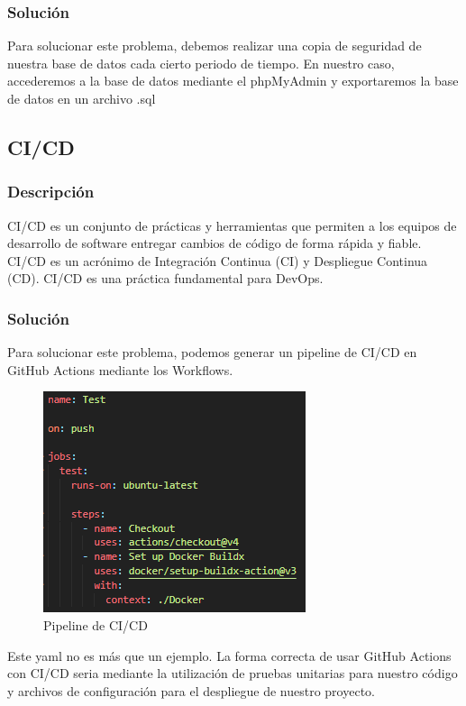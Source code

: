 \documentclass{report}
\begin{document}
                \subsubsection{Solución}
                    Para solucionar este problema, debemos realizar una copia de seguridad de nuestra base de datos cada cierto periodo de tiempo.
                    En nuestro caso, accederemos a la base de datos mediante el phpMyAdmin y exportaremos la base de datos en un archivo .sql
            \clearpage
            \subsection{CI/CD}
                \subsubsection{Descripción}
                    CI/CD es un conjunto de prácticas y herramientas que permiten a los equipos de desarrollo de software entregar cambios de código de forma rápida y fiable. CI/CD es un acrónimo de Integración Continua (CI) y Despliegue Continua (CD). CI/CD es una práctica fundamental para DevOps.
                \subsubsection{Solución}
                    Para solucionar este problema, podemos generar un pipeline de CI/CD en GitHub Actions mediante los Workflows.
                    \begin{figure}[H]
                        \centering
                        \includegraphics[width=\textwidth]{./img/vulnerabilidades/3.8/2.1.png}
                        \caption{Pipeline de CI/CD}
                    \end{figure}
                    Este yaml no es más que un ejemplo. La forma correcta de usar GitHub Actions con CI/CD seria mediante la utilización de pruebas unitarias para nuestro código y archivos de configuración para el despliegue de nuestro proyecto.
            \clearpage
\end{document}
